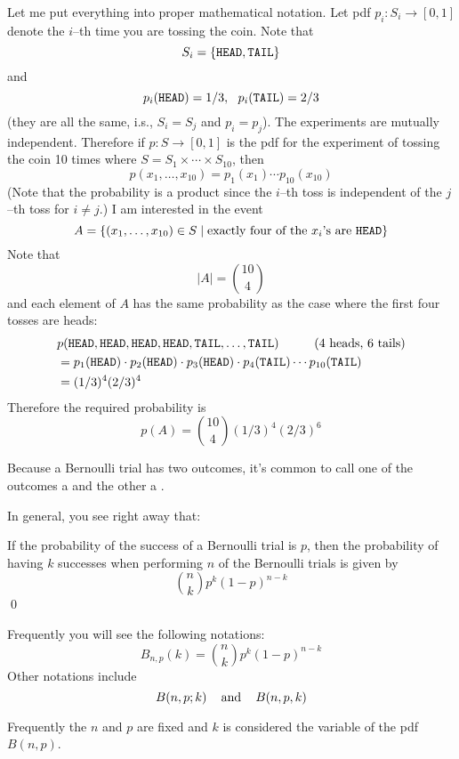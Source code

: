 Let me put everything into proper mathematical notation.
Let pdf $p_i : S_i \rightarrow [0,1]$
denote the $i$--th time you are tossing the coin.
Note that 
\[
S_i = \{\texttt{HEAD}, \texttt{TAIL}\}
\]
and
\[
p_i(\texttt{HEAD}) = 1/3, \,\,\,\, p_i(\texttt{TAIL}) = 2/3
\]
(they are all the same, i.s., $S_i = S_j$ and $p_i = p_j$).
The experiments are mutually independent.
Therefore if $p : S \rightarrow [0,1]$ is the pdf
for the experiment of tossing the coin 10 times 
where $S = S_1 \times \cdots \times S_{10}$,
then
\[
p(x_1, \ldots, x_{10}) = p_1(x_1) \cdots p_{10}(x_{10})
\]
(Note that the probability is a product since
the $i$--th toss is independent of the $j$--th toss for $i \neq j$.)
I am interested in the event
\[
A = \{(x_1, \ldots, x_{10}) \in S \mid 
\text{exactly four of the $x_i$'s are $\texttt{HEAD}$}\}
\]
Note that 
\[
|A| = \binom{10}{4}
\]
and each element of $A$ has the same probability as
the case where the first four tosses are heads:
\begin{align*}
&p(\texttt{HEAD}, \texttt{HEAD}, \texttt{HEAD}, \texttt{HEAD}, \texttt{TAIL}, \ldots, \texttt{TAIL}) \hspace{1cm} \text{(4 heads, 6 tails)}\\
&= p_1(\texttt{HEAD}) \cdot p_2(\texttt{HEAD}) \cdot p_3(\texttt{HEAD}) \cdot p_4(\texttt{TAIL}) \cdots p_{10}(\texttt{TAIL}) \\
&= (1/3)^4 (2/3)^4
\end{align*}
Therefore the required probability is
\[
p(A) = \binom{10}{4} (1/3)^4 (2/3)^6 
\]


Because a Bernoulli trial has two outcomes,
it's common to call one of the outcomes a
and the other a
.

In general, you see right away that:

\begin{thm}
If the probability of the success of a Bernoulli trial is $p$,
then the probability of having $k$ successes when performing
$n$ of the Bernoulli trials is given by 
\[
\binom{n}{k} p^k (1-p)^{n-k}
\]
\qed
\end{thm}

Frequently you will see the following notations:
\[
B_{n,p}(k) = \binom{n}{k} p^k (1-p)^{n-k}
\]
Other notations include
\[
B(n,p; k)
\text{ \,\,\, and \,\,\, }
B(n,p,k)
\]

Frequently the $n$ and $p$ are fixed and $k$ is considered the
variable of the pdf $B(n,p)$.

